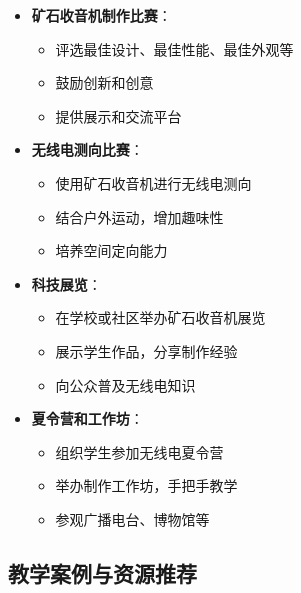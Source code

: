 \documentclass[12pt,UTF8]{ctexbook}
\begin{document}
\begin{itemize}[leftmargin=3.5em]
    \item \textbf{矿石收音机制作比赛}：
        \begin{itemize}[leftmargin=3.5em]
            \item 评选最佳设计、最佳性能、最佳外观等
            \item 鼓励创新和创意
            \item 提供展示和交流平台
        \end{itemize}
    \item \textbf{无线电测向比赛}：
        \begin{itemize}[leftmargin=3.5em]
            \item 使用矿石收音机进行无线电测向
            \item 结合户外运动，增加趣味性
            \item 培养空间定向能力
        \end{itemize}
    \item \textbf{科技展览}：
        \begin{itemize}[leftmargin=3.5em]
            \item 在学校或社区举办矿石收音机展览
            \item 展示学生作品，分享制作经验
            \item 向公众普及无线电知识
        \end{itemize}
    \item \textbf{夏令营和工作坊}：
        \begin{itemize}[leftmargin=3.5em]
            \item 组织学生参加无线电夏令营
            \item 举办制作工作坊，手把手教学
            \item 参观广播电台、博物馆等
        \end{itemize}
\end{itemize}

\subsection{教学案例与资源推荐}
\end{document}
